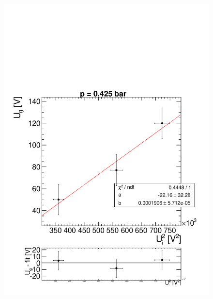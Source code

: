 \documentclass[a4paper,12pt]{article}
\begin{document}
\begin{figure}[htb]
		\includegraphics[height = 0.3\textheight]{linReg425bar.pdf}

\end{figure}
\end{document}
